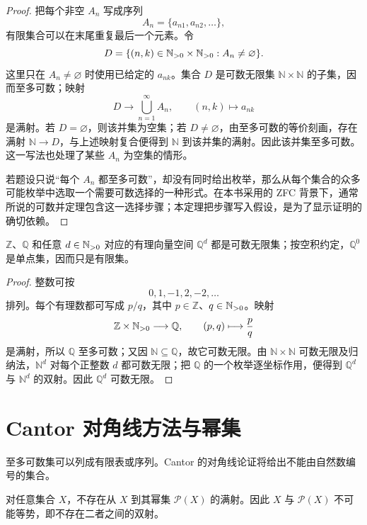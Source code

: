 \begin{proof}
把每个非空 \(A_n\) 写成序列
\[
  A_n=\{a_{n1},a_{n2},\ldots\},
\]
有限集合可以在末尾重复最后一个元素。令
\[
  D=\{(n,k)\in\mathbb{N}_{>0}\times\mathbb{N}_{>0}:A_n\ne\varnothing\}.
\]
这里只在 \(A_n\ne\varnothing\) 时使用已给定的 \(a_{nk}\)。集合 \(D\) 是可数无限集 \(\mathbb N\times\mathbb N\) 的子集，因而至多可数；映射
\[
  D\longrightarrow\bigcup_{n=1}^{\infty}A_n,
  \qquad (n,k)\longmapsto a_{nk}
\]
是满射。若 \(D=\varnothing\)，则该并集为空集；若 \(D\ne\varnothing\)，由至多可数的等价刻画，存在满射 \(\mathbb N\to D\)，与上述映射复合便得到 \(\mathbb N\) 到该并集的满射。因此该并集至多可数。这一写法也处理了某些 \(A_n\) 为空集的情形。

若题设只说“每个 \(A_n\) 都至多可数”，却没有同时给出枚举，那么从每个集合的众多可能枚举中选取一个需要可数选择的一种形式。在本书采用的 ZFC 背景下，通常所说的可数并定理包含这一选择步骤；本定理把步骤写入假设，是为了显示证明的确切依赖。
\end{proof}

\begin{corollary}
\(\mathbb Z\)、\(\mathbb Q\) 和任意 \(d\in\mathbb{N}_{>0}\) 对应的有理向量空间 \(\mathbb Q^d\) 都是可数无限集；按空积约定，\(\mathbb Q^0\) 是单点集，因而只是有限集。
\end{corollary}

\begin{proof}
整数可按
\[
  0,1,-1,2,-2,\ldots
\]
排列。每个有理数都可写成 \(p/q\)，其中 \(p\in\mathbb Z\)、\(q\in\mathbb{N}_{>0}\)。映射
\[
  \mathbb Z\times\mathbb{N}_{>0}\longrightarrow\mathbb Q,\qquad
  (p,q)\longmapsto\frac pq
\]
是满射，所以 \(\mathbb Q\) 至多可数；又因 \(\mathbb N\subseteq\mathbb Q\)，故它可数无限。由 \(\mathbb N\times\mathbb N\) 可数无限及归纳法，\(\mathbb N^d\) 对每个正整数 \(d\) 都可数无限；把 \(\mathbb Q\) 的一个枚举逐坐标作用，便得到 \(\mathbb Q^d\) 与 \(\mathbb N^d\) 的双射。因此 \(\mathbb Q^d\) 可数无限。
\end{proof}

\section{Cantor 对角线方法与幂集}


至多可数集可以列成有限表或序列。Cantor 的对角线论证将给出不能由自然数编号的集合。

\begin{theorem}[Cantor 定理]
对任意集合 \(X\)，不存在从 \(X\) 到其幂集 \(\mathcal P(X)\) 的满射。因此 \(X\) 与 \(\mathcal P(X)\) 不可能等势，即不存在二者之间的双射。
\end{theorem}

